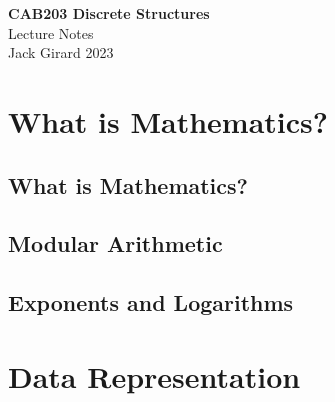 \documentclass{article}
\begin{document}
    \begin{titlepage}
        \begin{center}
            \LARGE{\textbf{CAB203 Discrete Structures}} \\[0.2in]
            \LARGE{Lecture Notes} \\[0.1in]
            \large{Jack Girard 2023}
        \end{center}
    \end{titlepage}
    
    \newpage

    \tableofcontents
    \newpage

    \section{What is Mathematics?}
        \subsection{What is Mathematics?}
        \subsection{Modular Arithmetic}
        \subsection{Exponents and Logarithms}

    \section{Data Representation}
\end{document}
